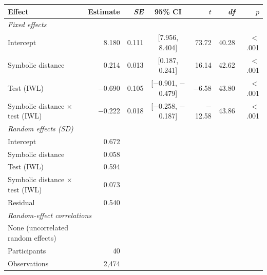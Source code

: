\begin{tabular}{lrrcrrr}
\toprule
Effect & Estimate & \textit{SE} & 95\% CI & $t$ & \textit{df} & $p$ \\
\midrule
\multicolumn{7}{l}{\textit{Fixed effects}} \\
\quad Intercept & 8.180 & 0.111 & [7.956, 8.404] & 73.72 & 40.28 & $<$.001 \\
\quad Symbolic distance & 0.214 & 0.013 & [0.187, 0.241] & 16.14 & 42.62 & $<$.001 \\
\quad Test (IWL) & $-$0.690 & 0.105 & [$-$0.901, $-$0.479] & $-$6.58 & 43.80 & $<$.001 \\
\quad Symbolic distance $\times$ test (IWL) & $-$0.222 & 0.018 & [$-$0.258, $-$0.187] & $-$12.58 & 43.86 & $<$.001 \\
\multicolumn{7}{l}{\textit{Random effects (SD)}} \\
\quad Intercept & 0.672 \\
\quad Symbolic distance & 0.058 \\
\quad Test (IWL) & 0.594 \\
\quad Symbolic distance $\times$ test (IWL) & 0.073 \\
\quad Residual & 0.540 \\
\multicolumn{7}{l}{\textit{Random-effect correlations}} \\
\quad None (uncorrelated random effects) \\
\midrule
Participants & 40 \\
Observations & 2,474 \\
\bottomrule
\end{tabular}
